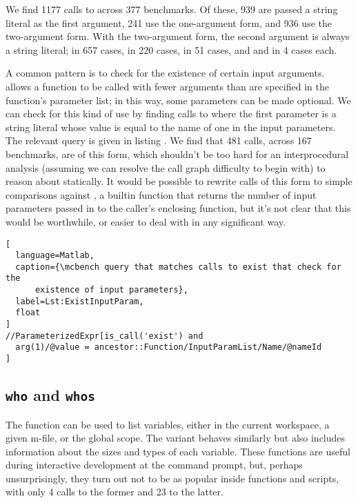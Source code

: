We find 1177 calls to  across 377 benchmarks. Of these, 939 are
passed a string literal as the first argument, 241 use the one-argument form,
and 936 use the two-argument form. With the two-argument form, the second
argument is always a string literal;  in 657 cases, 
in 220 cases,  in 51 cases, and  and 
in 4 cases each.

A common pattern is to check for the existence of certain input arguments.
\matlab allows a function to be called with fewer arguments than are specified
in the function's parameter list; in this way, some parameters can be made
optional. We can check for this kind of use by finding calls to 
where the first parameter is a string literal whose value is equal to the name
of one in the input parameters. The relevant query is given in listing
. We find that 481 calls, across 167 benchmarks,
are of this form, which shouldn't be too hard for an interprocedural analysis
(assuming we can resolve the call graph difficulty to begin with) to reason
about statically. It would be possible to rewrite calls of this form to simple
comparisons against , a builtin \matlab function that returns the
number of input parameters passed in to the caller's enclosing function, but
it's not clear that this would be worthwhile, or easier to deal with in any
significant way.

\begin{lstlisting}[
  language=Matlab,
  caption={\mcbench query that matches calls to exist that check for the
      existence of input parameters},
  label=Lst:ExistInputParam,
  float
]
//ParameterizedExpr[is_call('exist') and
  arg(1)/@value = ancestor::Function/InputParamList/Name/@nameId
]
\end{lstlisting}

\subsection{\texttt{who} and \texttt{whos}}

The  function can be used to list variables, either in the current
workspace, a given m-file, or the global scope. The  variant behaves
similarly but also includes information about the sizes and types of each
variable. These functions are useful during interactive development at the
command prompt, but, perhaps unsurprisingly, they turn out not to be as popular
inside functions and scripts, with only 4 calls to the former and 23 to the
latter.


